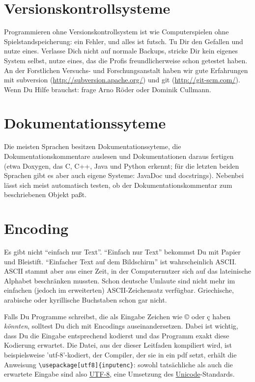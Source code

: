 \documentclass[twoside]{scrreprt}
\providecommand{\FVA}[1]{Forstliche#1 Versuchs- und Forschungsanstalt}
\begin{document}
\section{Versionskontrollsysteme\label{sec:vcs}}
Programmieren ohne Versionskontrollsystem ist wie Computerspielen ohne
Spielstandspeicherung: ein Fehler, und alles ist futsch.
Tu Dir den Gefallen und nutze eines.
Verlasse Dich nicht auf normale Backups, stricke Dir kein eigenes System selbst,
nutze eines, das die Profis freundlicherweise schon getestet haben.
An der \FVA{n} haben wir gute Erfahrungen mit
subversion (\url{http://subversion.apache.org/})
und git (\url{http://git-scm.com/}).
Wenn Du Hilfe brauchst: frage Arno R\"o{}der oder Dominik Cullmann. 

\section{Dokumentationssyteme\label{sec:doxygen}}
Die meisten Sprachen besitzen Dokumentationssyteme, die Dokumentationskommentare
auslesen und Dokumentationen daraus fertigen (etwa Doxygen, das C, C++, Java und
Python erkennt; f\"u{}r die letzten beiden Sprachen gibt es aber auch eigene
Systeme: JavaDoc und docstrings).
Nebenbei l\"a{}sst sich meist automatisch testen, ob der
Dokumentationskommentar zum beschriebenen Objekt pa\ss{}t.

\section{Encoding}
Es gibt nicht "`einfach nur Text"'. "`Einfach nur Text"' bekommst Du mit Papier
und Bleistift. "`Einfacher Text auf dem Bildschirm"' ist wahrscheinlich
ASCII. ASCII stammt aber aus einer Zeit, in der Computernutzer sich auf das
lateinische Alphabet beschr\"a{}nken mussten. 
Schon deutsche Umlaute sind nicht
mehr im einfachen (jedoch im erweiterten) ASCII-Zeichensatz verf\"u{}gbar.
Griechische, arabische oder kyrillische Buchstaben schon gar nicht.


Falls Du Programme schreibst, die als Eingabe Zeichen wie ©  oder ç haben
\emph{k\"o{}nnten}, solltest Du dich mit Encodings auseinandersetzen. Dabei
ist wichtig, dass Du die Eingabe entsprechend kodierst und das Programm exakt
diese Kodierung erwartet. Die Datei, aus der dieser Leitfaden kompiliert
wird, ist beispielsweise 'utf-8'-kodiert, der Compiler, der sie in ein pdf
setzt, erh\"a{}lt die Anweisung \verb+\usepackage[utf8]{inputenc}+: sowohl
tats\"a{}chliche als auch die erwartete Eingabe sind also
\href{http://en.wikipedia.org/wiki/UTF-8}{UTF-8}, eine Umsetzung des
\href{http://en.wikipedia.org/wiki/Unicode}{Unicode}-Standards.
\end{document}
